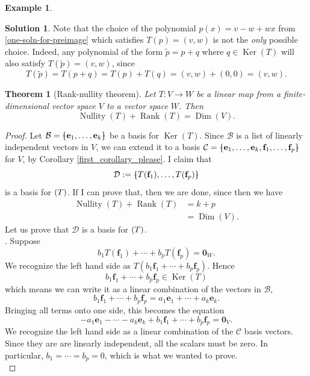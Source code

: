 \documentclass[a4paper,11pt]{book}
\newtheorem{theorem}{Theorem}
\theoremstyle{definition}
\newtheorem{example_environment}{Example}[chapter]
\newtheorem*{solution}{Solution}
\newcommand{\ve}[1]{\mathbf{#1}}
\newcommand{\basis}[1]{{\mathcal #1}}
\newenvironment{example}
	{
		\begin{oframed} 
		\begin{example_environment}
	}
	{
		\end{example_environment}
		\end{oframed}
	}
\newcommand{\bmark}{\raisebox{.53ex}{\rule{.2em}{.1ex}}}
\newcommand{\bopen}{{\protect\ooalign{\{\cr\hfil\bmark\hfil\cr}}}
\newcommand{\bclose}{{\protect\ooalign{\}\cr\hfil\bmark\hfil\cr}}}
\DeclareMathOperator{\Dim}{Dim}
\DeclareMathOperator{\Ker}{Ker}
\DeclareMathOperator{\Nullity}{Nullity}
\DeclareMathOperator{\Rank}{Rank}
\let\Im\relax
\DeclareMathOperator{\Im}{Im} %
\begin{document}
\begin{example}
\begin{solution}
Note that the choice of the polynomial $p(x) = v-w + w x$ from \eqref{one-soln-for-preimage} which satisfies $T(p) = (v,w)$ is not the {\em only} possible choice. Indeed, any polynomial of the form $\tilde{p} = p + q$ where $q \in \Ker(T)$ will also satisfy $T(\tilde{p}) = (v,w)$, since
\[
 T(\tilde{p}) = T(p + q) = T(p) + T(q) = (v,w) + (0,0) = (v,w).
\]
\end{solution}
\end{example}

\begin{theorem}[Rank-nullity theorem] \label{rank-nullity-theorem} Let $T : V \rightarrow W$ be a linear map from a finite-dimensional vector space $V$ to a vector space $W$. Then
\[
 \Nullity(T) + \Rank(T) = \Dim(V).
\]
\end{theorem}
\begin{proof}
Let $\basis{B} = \bopen \ve{e}_1, \ldots, \ve{e}_k \bclose$ be a basis for $\Ker(T)$. Since $\basis{B}$ is a list of linearly independent vectors in $V$, we can extend it to a basis $\basis{C} = \bopen \ve{e}_1, \ldots, \ve{e}_k, \ve{f}_1, \ldots, \ve{f}_p \bclose$ for $V$, by Corollary \ref{first_corollary_please}. I claim that 
\[
\basis{D} := \bopen T(\ve{f}_1), \ldots, T(\ve{f}_p) \bclose
\]
is a basis for $\Im(T)$. If I can prove that, then we are done, since then we have
\begin{align*}
 \Nullity(T) + \Rank(T) &= k + p \\
  &= \Dim(V).
\end{align*}
Let us prove that $\basis{D}$ is a basis for $\Im(T)$. \\

\noindent {\em $\basis{D}$ is linearly independent}. Suppose
\[
 b_1 T(\ve{f}_1) + \cdots + b_p T(\ve{f}_p) = \ve{0}_W.
\]
We recognize the left hand side as $T(b_1 \ve{f}_1 + \cdots + b_p \ve{f}_p)$. Hence 
\[
 b_1 \ve{f}_1 + \cdots + b_p \ve{f}_p \in \Ker(T)
\]
which means we can write it as a linear combination of the vectors in $\basis{B}$,
\[
b_1 \ve{f}_1 + \cdots + b_p \ve{f}_p = a_1 \ve{e}_1 + \cdots + a_k \ve{e}_k.
\]
Bringing all terms onto one side, this becomes the equation
\[
 -a_1 \ve{e}_1 - \cdots -a_k \ve{e}_k + b_1 \ve{f}_1 + \cdots + b_p \ve{f}_p = \ve{0}_V.
\]
We recognize the left hand side as a linear combination of the $\basis{C}$ basis vectors. Since they are are linearly independent, all the scalars must be zero. In particular, $b_1 = \cdots = b_p = 0$, which is what we wanted to prove. \\


\end{proof}
\end{document}
